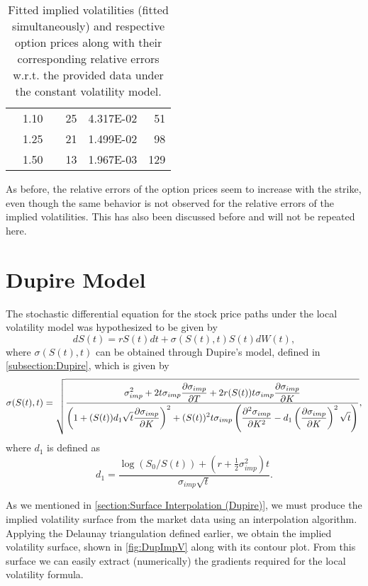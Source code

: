 \begin{table}[H]
\begin{tabular}{@{}cccrcr@{}}
 & 1.10 &  & 25 & \num{4.317E-02} & 51 \\
 & 1.25 &  & 21 & \num{1.499E-02} & 98 \\
 & 1.50 &  & 13 & \num{1.967E-03} & 129 \\ \bottomrule
\end{tabular}
  \caption[Fitted implied volatilities (fitted simultaneously) and respective option prices along with their corresponding relative errors w.r.t. the provided data under the constant volatility model.]{Fitted implied volatilities (fitted simultaneously) and respective option prices along with their corresponding relative errors w.r.t. the provided data under the constant volatility model.}
  \label{tab:CV2}
\end{table}

As before, the relative errors of the option prices seem to increase with the strike, even though the same behavior is not observed for the relative errors of the implied volatilities. This has also been discussed before and will not be repeated here.

\vspace{\fill}
\newpage

\section{Dupire Model}
The stochastic differential equation for the stock price paths under the local volatility model was hypothesized to be given by
\begin{equation}\label{dupmodds}
dS(t)=rS(t)dt+\sigma(S(t),t)S(t)dW(t),
\end{equation}
\noindent where $\sigma(S(t),t)$ can be obtained through Dupire's model, defined in \autoref{subsection:Dupire}, which is given by
\begin{equation}\label{dupmodds2}
\sigma(S(t),t)=\sqrt{\frac{\displaystyle\sigma_{imp}^2+2t\sigma_{imp}\pdv{\sigma_{imp}}{T}+2r(S(t))t\sigma_{imp}\pdv{\sigma_{imp}}{K}}{\displaystyle\left(1+(S(t))d_1\sqrt{t}\pdv{\sigma_{imp}}{K}\right)^2+(S(t))^2t\sigma_{imp}\left(\pdv{^2\sigma_{imp}}{K^2}-d_1\left(\pdv{\sigma_{imp}}{K}\right)^2\sqrt{t}\right)}},
\end{equation}
\noindent where $d_1$ is defined as
\begin{equation}
d_1=\frac{\log(S_0/S(t))+\left(r+\frac{1}{2}\sigma_{imp}^2\right)t}{\sigma_{imp}\sqrt{t}}.
\end{equation}

As we mentioned in \autoref{section:Surface Interpolation (Dupire)}, we must produce the implied volatility surface from the market data using an interpolation algorithm. Applying the Delaunay triangulation defined earlier, we obtain the implied volatility surface, shown in \autoref{fig:DupImpV} along with its contour plot.
From this surface we can easily extract (numerically) the gradients required for the local volatility formula.



